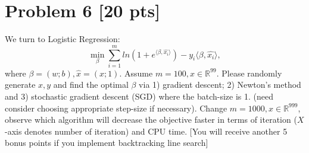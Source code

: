 \documentclass[11pt]{article}
\newcommand{\R}{\mathbb{R}}
\def \lg       {\langle}
\def \rg       {\rangle}
\def \R {\mathbb{R}}
\begin{document}
\section*{Problem 6 [20 pts]}
We turn to Logistic Regression:
\begin{equation}
	\min_\beta \sum\limits_{i=1}^{m} ln(1+e^{\lg \beta, \hat{x_i}\rg})-y_{i}\lg \beta, \hat{x_i}\rg, 
\end{equation}
where $\beta=(w;b), \hat{x}=(x;1)$. Assume $m=100, x\in\R^{99}$. Please randomly generate $x, y$ and find the optimal $\beta$ via 1) gradient descent; 2) Newton's method and 3) stochastic gradient descent (SGD) where the batch-size is 1. (need consider choosing appropriate  step-size if necessary). Change $m=1000, x\in\R^{999}$, observe which algorithm will decrease the objective faster in terms of iteration ($X$-axis denotes number of iteration) and CPU time. [You will receive another 5 bonus points if you implement backtracking line search]\\
\end{document}
